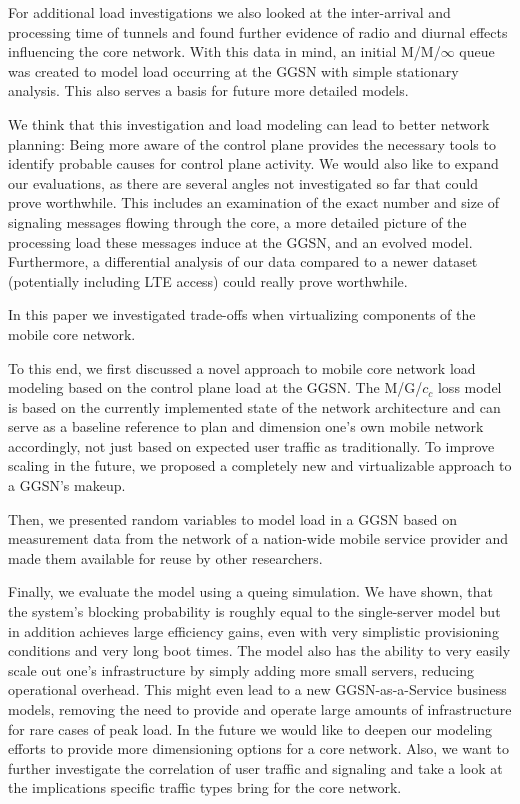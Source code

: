 For additional load investigations we also looked at the inter-arrival and processing time of tunnels and found further evidence of radio and diurnal effects influencing the core network. With this data in mind, an initial M/M/$\infty$ queue was created to model load occurring at the \gls{GGSN} with simple stationary analysis. This also serves a basis for future more detailed models.

We think that this investigation and load modeling can lead to better network planning: Being more aware of the control plane provides the necessary tools to identify probable causes for control plane activity. We would also like to expand our evaluations, as there are several angles not investigated so far that could prove worthwhile. This includes an examination of the exact number and size of signaling messages flowing through the core, a more detailed picture of the processing load these messages induce at the \gls{GGSN}, and an evolved model. Furthermore, a differential analysis of our data compared to a newer dataset (potentially including \gls{LTE} access) could really prove worthwhile.



In this paper we investigated trade-offs when virtualizing components of the mobile core network.

To this end, we first discussed a novel approach to mobile core network load modeling based on the control plane load at the \gls{GGSN}. The M/G/$c_c$ loss model is based on the currently implemented state of the network architecture and can serve as a baseline reference to plan and dimension one's own mobile network accordingly, not just based on expected user traffic as traditionally. To improve scaling in the future, we proposed a completely new and virtualizable approach to a \gls{GGSN}'s makeup.

Then, we presented random variables to model load in a \gls{GGSN} based on measurement data from the network of a nation-wide mobile service provider and made them available for reuse by other researchers.

Finally, we evaluate the model using a queing simulation. We have shown, that the system's blocking probability is roughly equal to the single-server model but in addition achieves large efficiency gains, even with very simplistic provisioning conditions and very long boot times. The model also has the ability to very easily scale out one's infrastructure by simply adding more small servers, reducing operational overhead. This might even lead to a new GGSN-as-a-Service business models, removing the need to provide and operate large amounts of infrastructure for rare cases of peak load. 
In the future we would like to deepen our modeling efforts to provide more dimensioning options for a core network. Also, we want to further investigate the correlation of user traffic and signaling and take a look at the implications specific traffic types bring for the core network. 